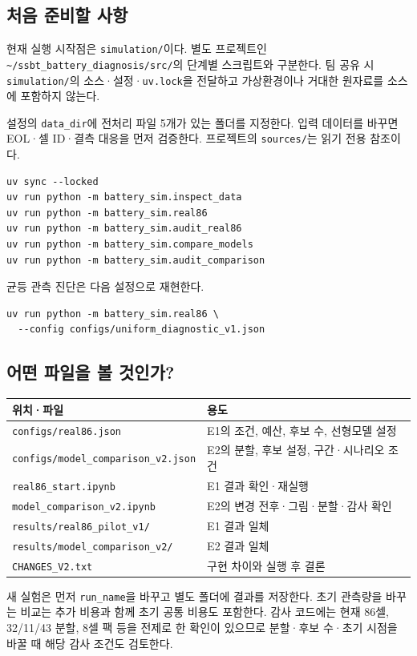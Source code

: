 \documentclass[11pt,a4paper]{article}
\newcommand{\file}[1]{{\small\nolinkurl{#1}}}
\begin{document}
\subsection*{처음 준비할 사항}
현재 실행 시작점은 \file{simulation/}이다. 별도 프로젝트인 \file{~/ssbt_battery_diagnosis/src/}의 단계별 스크립트와 구분한다. 팀 공유 시 \file{simulation/}의 소스·설정·\file{uv.lock}을 전달하고 가상환경이나 거대한 원자료를 소스에 포함하지 않는다.

설정의 \file{data_dir}에 전처리 파일 5개가 있는 폴더를 지정한다. 입력 데이터를 바꾸면 EOL·셀 ID·결측 대응을 먼저 검증한다. 프로젝트의 \file{sources/}는 읽기 전용 참조이다.

\begin{Verbatim}[fontsize=\small]
uv sync --locked
uv run python -m battery_sim.inspect_data
uv run python -m battery_sim.real86
uv run python -m battery_sim.audit_real86
uv run python -m battery_sim.compare_models
uv run python -m battery_sim.audit_comparison
\end{Verbatim}

균등 관측 진단은 다음 설정으로 재현한다.
\begin{Verbatim}[fontsize=\small]
uv run python -m battery_sim.real86 \
  --config configs/uniform_diagnostic_v1.json
\end{Verbatim}

\subsection*{어떤 파일을 볼 것인가?}
\begin{tabular}{p{.38\linewidth}p{.52\linewidth}}
\toprule
위치·파일 & 용도 \\
\midrule
\file{configs/real86.json} & E1의 조건, 예산, 후보 수, 선형모델 설정 \\
\file{configs/model_comparison_v2.json} & E2의 분할, 후보 설정, 구간·시나리오 조건 \\
\file{real86_start.ipynb} & E1 결과 확인·재실행 \\
\file{model_comparison_v2.ipynb} & E2의 변경 전후·그림·분할·감사 확인 \\
\file{results/real86_pilot_v1/} & E1 결과 일체 \\
\file{results/model_comparison_v2/} & E2 결과 일체 \\
\file{CHANGES_V2.txt} & 구현 차이와 실행 후 결론 \\
\bottomrule
\end{tabular}

새 실험은 먼저 \file{run_name}을 바꾸고 별도 폴더에 결과를 저장한다. 초기 관측량을 바꾸는 비교는 추가 비용과 함께 초기 공통 비용도 포함한다. 감사 코드에는 현재 86셀, 32/11/43 분할, 8셀 팩 등을 전제로 한 확인이 있으므로 분할·후보 수·초기 시점을 바꿀 때 해당 감사 조건도 검토한다.
\end{document}
